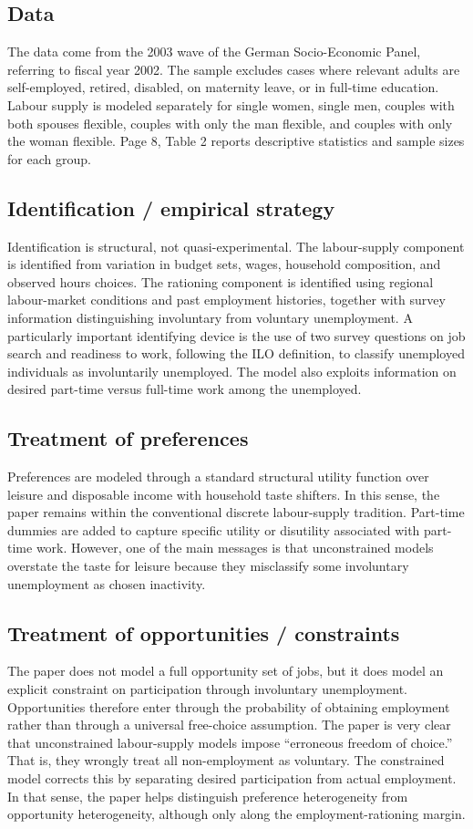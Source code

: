 \documentclass[11pt,a4paper]{article}
\begin{document}
\subsection*{Data}
The data come from the 2003 wave of the German Socio-Economic Panel, referring to fiscal year 2002. The sample excludes cases where relevant adults are self-employed, retired, disabled, on maternity leave, or in full-time education. Labour supply is modeled separately for single women, single men, couples with both spouses flexible, couples with only the man flexible, and couples with only the woman flexible. Page 8, Table 2 reports descriptive statistics and sample sizes for each group.

\subsection*{Identification / empirical strategy}
Identification is structural, not quasi-experimental. The labour-supply component is identified from variation in budget sets, wages, household composition, and observed hours choices. The rationing component is identified using regional labour-market conditions and past employment histories, together with survey information distinguishing involuntary from voluntary unemployment. A particularly important identifying device is the use of two survey questions on job search and readiness to work, following the ILO definition, to classify unemployed individuals as involuntarily unemployed. The model also exploits information on desired part-time versus full-time work among the unemployed.

\subsection*{Treatment of preferences}
Preferences are modeled through a standard structural utility function over leisure and disposable income with household taste shifters. In this sense, the paper remains within the conventional discrete labour-supply tradition. Part-time dummies are added to capture specific utility or disutility associated with part-time work. However, one of the main messages is that unconstrained models overstate the taste for leisure because they misclassify some involuntary unemployment as chosen inactivity.

\subsection*{Treatment of opportunities / constraints}
The paper does not model a full opportunity set of jobs, but it does model an explicit constraint on participation through involuntary unemployment. Opportunities therefore enter through the probability of obtaining employment rather than through a universal free-choice assumption. The paper is very clear that unconstrained labour-supply models impose “erroneous freedom of choice.” That is, they wrongly treat all non-employment as voluntary. The constrained model corrects this by separating desired participation from actual employment. In that sense, the paper helps distinguish preference heterogeneity from opportunity heterogeneity, although only along the employment-rationing margin.
\end{document}

